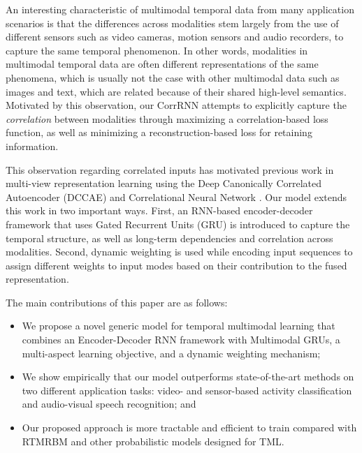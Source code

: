 \documentclass[10pt,twocolumn,letterpaper]{article}
\begin{document}

An interesting characteristic of multimodal temporal data from many application scenarios is that the differences across modalities stem largely from the use of different sensors such as video cameras, motion sensors and audio recorders, to capture the same temporal phenomenon. In other words, modalities in multimodal temporal data are often different representations of the same phenomena, which is usually not the case with other multimodal data such as images and text, which are related because of their shared high-level semantics. Motivated by this observation, our CorrRNN attempts to explicitly capture the \textit{correlation} between modalities through maximizing a correlation-based loss function, as well as minimizing a reconstruction-based loss for retaining information. 

This observation regarding correlated inputs has motivated previous work in multi-view representation learning using the Deep Canonically Correlated Autoencoder (DCCAE) \cite{wang2015deep} and Correlational Neural Network \cite{chandar2015correlational}. Our model extends this work in two important ways. First, an RNN-based encoder-decoder framework that uses Gated Recurrent Units (GRU) \cite{ChoMGBBSB14} is introduced to capture the  temporal structure, as well as long-term dependencies and correlation across modalities. Second, dynamic weighting is used while encoding input sequences to assign different weights to input modes based on their contribution to the fused representation. %

The main contributions of this paper are as follows: 
\begin{itemize}
\item We propose a novel generic model for temporal multimodal learning that combines an Encoder-Decoder RNN framework with Multimodal GRUs, a multi-aspect learning objective,  and a dynamic weighting mechanism;
\item We show empirically that our model outperforms state-of-the-art methods on two different application tasks: video- and sensor-based activity classification and audio-visual speech recognition; and  
\item Our proposed approach is more tractable and efficient to train compared with RTMRBM and other probabilistic models designed for TML.
\end{itemize}
\end{document}
